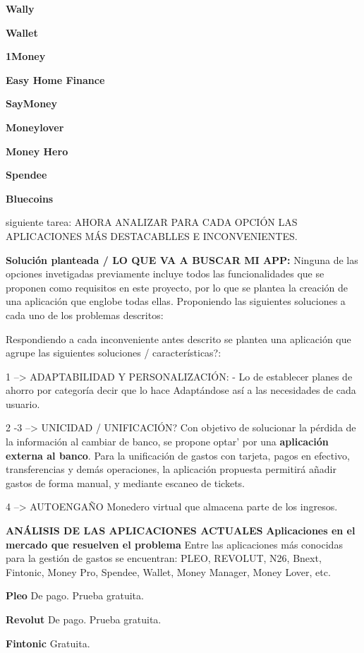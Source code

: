 \textbf{Wally} 

\textbf{Wallet} 

\textbf{1Money} 

\textbf{Easy Home Finance} 

\textbf{SayMoney} 

\textbf{Moneylover}

\textbf{Money Hero}

\textbf{Spendee}

\textbf{Bluecoins}


siguiente tarea:
AHORA ANALIZAR PARA CADA OPCIÓN LAS APLICACIONES MÁS DESTACABLLES E INCONVENIENTES.


\textbf{Solución planteada / LO QUE VA A BUSCAR MI APP:}
Ninguna de las opciones invetigadas previamente incluye todos las funcionalidades 
que se proponen como requisitos en este proyecto, por lo que se plantea la creación
de una aplicación que englobe todas ellas.
Proponiendo las siguientes soluciones a cada uno de los problemas descritos:



Respondiendo a cada inconveniente antes descrito se plantea una aplicación que 
agrupe las siguientes soluciones / características?:


1 --> ADAPTABILIDAD Y PERSONALIZACIÓN: 
- Lo de establecer planes de ahorro por categoría decir que lo hace
Adaptándose así a las necesidades de cada usuario.

2 -3 --> UNICIDAD / UNIFICACIÓN?
Con objetivo de solucionar la pérdida de la información al cambiar de banco, 
se propone optar' por una \textbf{aplicación externa al banco}. Para la unificación de gastos 
con tarjeta, pagos en efectivo, transferencias y demás operaciones, la 
aplicación propuesta permitirá añadir gastos de forma manual, y mediante 
escaneo de tickets. 



4 --> AUTOENGAÑO
Monedero virtual que almacena parte de los ingresos.


\textbf{ANÁLISIS DE LAS APLICACIONES ACTUALES}
\textbf{Aplicaciones en el mercado que resuelven el problema}
Entre las aplicaciones más conocidas para la gestión de gastos se encuentran:
PLEO, REVOLUT, N26, Bnext, Fintonic, Money Pro, Spendee, Wallet, Money Manager, Money Lover, etc.

\textbf{Pleo} De pago. Prueba gratuita.

\textbf{Revolut} De pago. Prueba gratuita.

\textbf{Fintonic} Gratuita. 

